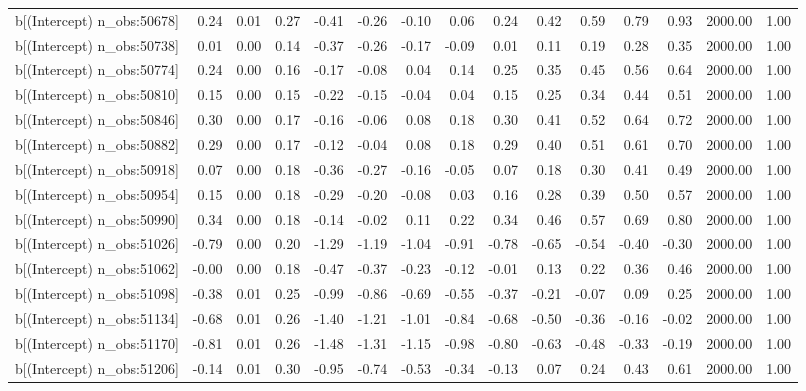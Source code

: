 \begin{table}[ht]
\begin{tabular}{rrrrrrrrrrrrrrr}
  b[(Intercept) n\_obs:50678] & 0.24 & 0.01 & 0.27 & -0.41 & -0.26 & -0.10 & 0.06 & 0.24 & 0.42 & 0.59 & 0.79 & 0.93 & 2000.00 & 1.00 \\ 
  b[(Intercept) n\_obs:50738] & 0.01 & 0.00 & 0.14 & -0.37 & -0.26 & -0.17 & -0.09 & 0.01 & 0.11 & 0.19 & 0.28 & 0.35 & 2000.00 & 1.00 \\ 
  b[(Intercept) n\_obs:50774] & 0.24 & 0.00 & 0.16 & -0.17 & -0.08 & 0.04 & 0.14 & 0.25 & 0.35 & 0.45 & 0.56 & 0.64 & 2000.00 & 1.00 \\ 
  b[(Intercept) n\_obs:50810] & 0.15 & 0.00 & 0.15 & -0.22 & -0.15 & -0.04 & 0.04 & 0.15 & 0.25 & 0.34 & 0.44 & 0.51 & 2000.00 & 1.00 \\ 
  b[(Intercept) n\_obs:50846] & 0.30 & 0.00 & 0.17 & -0.16 & -0.06 & 0.08 & 0.18 & 0.30 & 0.41 & 0.52 & 0.64 & 0.72 & 2000.00 & 1.00 \\ 
  b[(Intercept) n\_obs:50882] & 0.29 & 0.00 & 0.17 & -0.12 & -0.04 & 0.08 & 0.18 & 0.29 & 0.40 & 0.51 & 0.61 & 0.70 & 2000.00 & 1.00 \\ 
  b[(Intercept) n\_obs:50918] & 0.07 & 0.00 & 0.18 & -0.36 & -0.27 & -0.16 & -0.05 & 0.07 & 0.18 & 0.30 & 0.41 & 0.49 & 2000.00 & 1.00 \\ 
  b[(Intercept) n\_obs:50954] & 0.15 & 0.00 & 0.18 & -0.29 & -0.20 & -0.08 & 0.03 & 0.16 & 0.28 & 0.39 & 0.50 & 0.57 & 2000.00 & 1.00 \\ 
  b[(Intercept) n\_obs:50990] & 0.34 & 0.00 & 0.18 & -0.14 & -0.02 & 0.11 & 0.22 & 0.34 & 0.46 & 0.57 & 0.69 & 0.80 & 2000.00 & 1.00 \\ 
  b[(Intercept) n\_obs:51026] & -0.79 & 0.00 & 0.20 & -1.29 & -1.19 & -1.04 & -0.91 & -0.78 & -0.65 & -0.54 & -0.40 & -0.30 & 2000.00 & 1.00 \\ 
  b[(Intercept) n\_obs:51062] & -0.00 & 0.00 & 0.18 & -0.47 & -0.37 & -0.23 & -0.12 & -0.01 & 0.13 & 0.22 & 0.36 & 0.46 & 2000.00 & 1.00 \\ 
  b[(Intercept) n\_obs:51098] & -0.38 & 0.01 & 0.25 & -0.99 & -0.86 & -0.69 & -0.55 & -0.37 & -0.21 & -0.07 & 0.09 & 0.25 & 2000.00 & 1.00 \\ 
  b[(Intercept) n\_obs:51134] & -0.68 & 0.01 & 0.26 & -1.40 & -1.21 & -1.01 & -0.84 & -0.68 & -0.50 & -0.36 & -0.16 & -0.02 & 2000.00 & 1.00 \\ 
  b[(Intercept) n\_obs:51170] & -0.81 & 0.01 & 0.26 & -1.48 & -1.31 & -1.15 & -0.98 & -0.80 & -0.63 & -0.48 & -0.33 & -0.19 & 2000.00 & 1.00 \\ 
  b[(Intercept) n\_obs:51206] & -0.14 & 0.01 & 0.30 & -0.95 & -0.74 & -0.53 & -0.34 & -0.13 & 0.07 & 0.24 & 0.43 & 0.61 & 2000.00 & 1.00 \\ 

\end{tabular}
\end{table}
